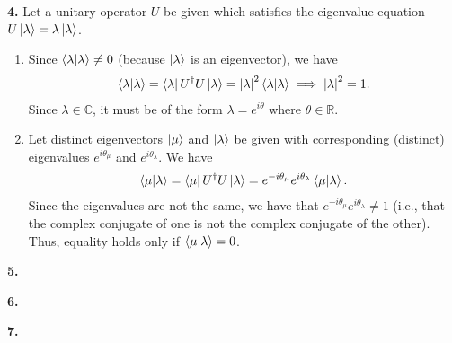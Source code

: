 \documentclass{article}
\theoremstyle{definition}
\begin{document}
\noindent \textbf{4.} Let a unitary operator $U$ be given which satisfies the eigenvalue equation $U\ket{\lambda} = \lambda\ket{\lambda}$.

\begin{enumerate}[label = (\alph*)]
	\item Since $\braket{\lambda} \neq 0$ (because $\ket{\lambda}$ is an eigenvector), we have
	\begin{align*}
	\braket{\lambda} = \bra{\lambda} U^\dagger U  \ket{\lambda } = \abs{\lambda}^2 \braket{\lambda} \implies  \abs{\lambda}^2 = 1.
	\end{align*}
	Since $\lambda\in \mathbb{C}$, it must be of the form $\lambda = e^{i\theta}$	where $\theta\in \mathbb{R}$. 
	
	
	\item Let distinct  eigenvectors $\ket{\mu}$ and $\ket{\lambda}$ be given with corresponding (distinct) eigenvalues $e^{i\theta_\mu}$ and $e^{i\theta_\lambda}$. We have
	\begin{align*}
	\bra{\mu}\ket{\lambda} = \bra{\mu} U^\dagger U \ket{\lambda} =  e^{-i\theta_\mu}e^{i\theta_\lambda}\bra{\mu}\ket{\lambda}.
	\end{align*}
	Since the eigenvalues are not the same, we have that $e^{-i\theta_\mu}e^{i\theta_\lambda} \neq 1$ (i.e., that the complex conjugate of one is not the complex conjugate of the other). Thus, equality holds only if $\bra{\mu}\ket{\lambda} = 0$. 
\end{enumerate}



\noindent \textbf{5.}



\noindent \textbf{6.}


\noindent \textbf{7.}
	
\end{document}
